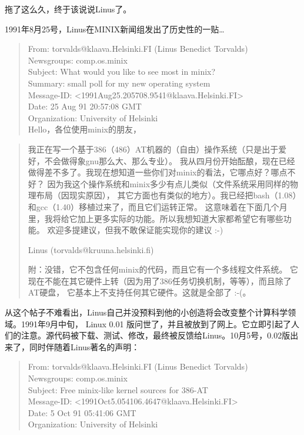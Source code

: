 \documentclass[12pt,a4paper]{article}
\begin{document}
  拖了这么久，终于该说说Linus了。

  1991年8月25号，Linus在MINIX新闻组发出了历史性的一贴\ldots{}

\begin{verse}
From: torvalds@klaava.Helsinki.FI (Linus Benedict Torvalds)\\
Newsgroups: comp.os.minix\\
Subject: What would you like to see most in minix?\\
Summary: small poll for my new operating system\\
Message-ID: <1991Aug25.205708.9541@klaava.Helsinki.FI>\\
Date: 25 Aug 91 20:57:08 GMT\\
Organization: University of Helsinki\\
\vspace*{1em}
Hello，各位使用minix的朋友，\\
\end{verse}

\begin{quote}
我正在写一个基于386（486）AT机器的（自由）操作系统（只是出于爱好，不会做得象gnu那么大、那么专业）。
我从四月份开始酝酿，现在已经做得差不多了。我现在想知道一些你们对minix的看法，它哪点好？哪点不好？
因为我这个操作系统和minix多少有点儿类似（文件系统采用同样的物理布局（因现实原因），
其它方面也有类似的地方）。我已经把bash（1.08）和gcc（1.40）移植过来了，而且它们运转正常。
这意味着在下面几个月里，我将给它加上更多实际的功能。所以我想知道大家都希望它有哪些功能。
欢迎多提建议，但我不敢保证能实现你的建议 :-)

Linus (torvalds@kruuna.helsinki.fi)

附：没错，它不包含任何minix的代码，而且它有一个多线程文件系统。
它现在不能在其它硬件上转（因为用了386任务切换机制，等等），而且除了AT硬盘，
它基本上不支持任何其它硬件。这就是全部了 :-(。
\end{quote}

  从这个帖子不难看出，Linus自己并没预料到他的小创造将会改变整个计算科学领域。1991年9月中旬， Linux 0.01 版问世了，并且被放到了网上。它立即引起了人们的注意。源代码被下载、测试、修改，最终被反馈给Linus。10月5号，0.02版出来了，同时伴随着Linus著名的声明：
\begin{verse}
From: torvalds@klaava.Helsinki.FI (Linus Benedict Torvalds)\\
Newsgroups: comp.os.minix\\
Subject: Free minix-like kernel sources for 386-AT\\
Message-ID: <1991Oct5.054106.4647@klaava.Helsinki.FI>\\
Date: 5 Oct 91 05:41:06 GMT\\
Organization: University of Helsinki\\
\end{verse}
\end{document}
